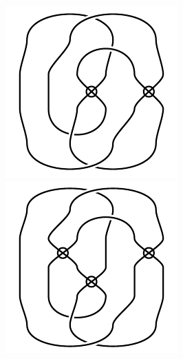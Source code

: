\begin{figure}[H]
\begin{minipage}[b]{.18\linewidth}
\centering
\includegraphics[width=\linewidth]{../data/virtual_4_67.png}
\end{minipage}
\begin{minipage}[b]{.18\linewidth}
\centering
\includegraphics[width=\linewidth]{../data/virtual_4_68.png}

\end{minipage}
\end{figure}
